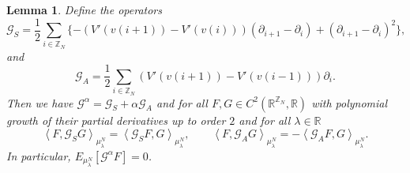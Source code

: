 \documentclass[11pt, a4paper]{article}
\newtheorem{lemma}[theorem]{Lemma}
\newcommand{\CG}{\mathscr{G}}
\newcommand{\1}{\mathbf{1}}
\begin{document}
\begin{lemma}
  \label{lem:generator}Define the operators
  \[ \CG_S = \frac{1}{2} \sum_{i \in \mathbb{Z}_N} \{ - (V' (v (i + 1)) - V'
     (v (i))) (\partial_{i + 1} - \partial_i) + (\partial_{i + 1} -
     \partial_i)^2 \}, \]
  and
  \[ \CG_A = \frac{1}{2} \sum_{i \in \mathbb{Z}_N} (V' (v (i + 1)) - V' (v (i
     - 1))) \partial_i . \]
  Then we have $\CG^{\alpha} = \CG_S + \alpha \CG_A$ and for all $F, G \in C^2
  (\mathbb{R}^{\mathbb{Z}_N}, \mathbb{R})$ with polynomial growth of their
  partial derivatives up to order $2$ and for all $\lambda \in \mathbb{R}$
  \[ \left\langle F, \CG_S G \right\rangle_{{\mu}^N_{\lambda}} =
     \left\langle \CG_S F, G \right\rangle_{{\mu}^N_{\lambda}},
     \hspace{2em} \left\langle F, \CG_A G
     \right\rangle_{{\mu}^N_{\lambda}} = - \left\langle \CG_A F, G
     \right\rangle_{{\mu}^N_{\lambda}} . \]
  In particular, $E_{{\mu}^N_{\lambda}} \left[ \CG^{\alpha} F \right] =
  0$.
\end{lemma}
\end{document}
